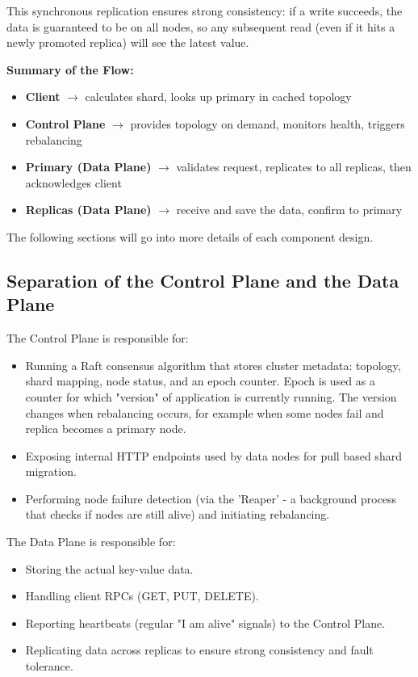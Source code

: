 \documentclass[shortabstract]{iithesis}
\begin{document}
This synchronous replication ensures strong consistency: if a write succeeds, the data is guaranteed to be on all nodes, so any subsequent read (even if it hits a newly promoted replica) will see the latest value.

\textbf{Summary of the Flow:}
\begin{itemize}
    \item \textbf{Client} $\rightarrow$ calculates shard, looks up primary in cached topology
    \item \textbf{Control Plane} $\rightarrow$ provides topology on demand, monitors health, triggers rebalancing
    \item \textbf{Primary (Data Plane)} $\rightarrow$ validates request, replicates to all replicas, then acknowledges client
    \item \textbf{Replicas (Data Plane)} $\rightarrow$ receive and save the data, confirm to primary
\end{itemize}

The following sections will go into more details of each component design.

\subsection{Separation of the Control Plane and the Data Plane}
The Control Plane is responsible for:
\begin{itemize}
    \item Running a Raft consensus algorithm that stores cluster metadata: topology, shard mapping, node status, and an epoch counter. Epoch is used as a counter for which "version" of application is currently running. The version changes when rebalancing occurs, for example when some nodes fail and replica becomes a primary node. 
    \item Exposing internal HTTP endpoints used by data nodes for pull based shard migration.
    \item Performing node failure detection (via the 'Reaper' - a background process that checks if nodes are still alive) and initiating rebalancing.
\end{itemize}

\noindent The Data Plane is responsible for:
\begin{itemize}
    \item Storing the actual key-value data.
    \item Handling client RPCs (GET, PUT, DELETE).
    \item Reporting heartbeats (regular "I am alive" signals) to the Control Plane.
    \item Replicating data across replicas to ensure strong consistency and fault tolerance.
\end{itemize}
\end{document}
